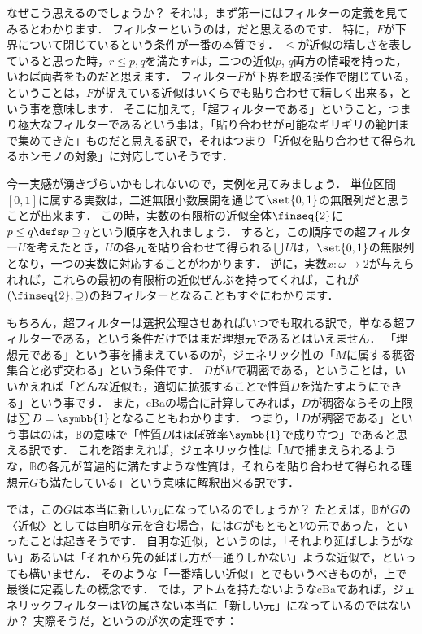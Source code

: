 \documentclass[a4j]{ltjsarticle}
\newcommand{\mathds}[1]{\symbb{#1}}
\renewcommand{\emph}[1]{\textbf{\textgt{#1}}}
\begin{document}
なぜこう思えるのでしょうか？
それは，まず第一にはフィルターの定義を見てみるとわかります．
フィルターというのは，\emph{貼り合わせられる近似の集合}だと思えるのです．
特に，$F$が下界について閉じているという条件が一番の本質です．
$\leq$が近似の精しさを表していると思った時，$r \leq p, q$を満たす$r$は，二つの近似$p$, $q$両方の情報を持った，いわば両者を\emph{貼り合わせた}ものだと思えます．
フィルター$F$が下界を取る操作で閉じている，ということは，$F$が捉えている近似はいくらでも貼り合わせて精しく出来る，という事を意味します．
そこに加えて，「超フィルターである」ということ，つまり極大なフィルターであるという事は，「貼り合わせが可能なギリギリの範囲まで集めてきた」ものだと思える訳で，それはつまり「近似を貼り合わせて得られるホンモノの対象」に対応していそうです．

今一実感が湧きづらいかもしれないので，実例を見てみましょう．
単位区間$[0,1]$に属する実数は，二進無限小数展開を通じて$\set{0, 1}$の無限列だと思うことが出来ます．
この時，実数の有限桁の近似全体$\finseq{2}$に$p \leq q \defs p \supseteq q$という順序を入れましょう．
すると，この順序での超フィルター$U$を考えたとき，$U$の各元を貼り合わせて得られる$\bigcup U$は，$\set{0, 1}$の無限列となり，一つの実数に対応することがわかります．
逆に，実数$x : \omega \to 2$が与えられれば，これらの最初の有限桁の近似ぜんぶを持ってくれば，これが$(\finseq{2}, \supseteq)$の超フィルターとなることもすぐにわかります．

もちろん，超フィルターは選択公理させあればいつでも取れる訳で，単なる超フィルターである，という条件だけではまだ理想元であるとはいえません．
「理想元である」という事を捕まえているのが，ジェネリック性の「$M$に属する稠密集合と必ず交わる」という条件です．
$D$が$M$で稠密である，ということは，いいかえれば「どんな近似も，適切に拡張することで性質$D$を満たすようにできる」という事です．
また，cBaの場合に計算してみれば，$D$が稠密ならその上限は$\sum D = \mathds{1}$となることもわかります．
つまり，「$D$が稠密である」という事はのは，$\mathbb{B}$の意味で「性質$D$はほぼ確率$\mathds{1}$で成り立つ」であると思える訳です．
これを踏まえれば，ジェネリック性は「$M$で捕まえられるような，$\mathbb{B}$の各元が普遍的に満たすような性質は，それらを貼り合わせて得られる理想元$G$も満たしている」という意味に解釈出来る訳です．

では，この$G$は本当に新しい元になっているのでしょうか？
たとえば，$\mathbb{B}$が$G$の〈近似〉としては自明な元を含む場合，には$G$がもともと$V$の元であった，といったことは起きそうです．
自明な近似，というのは，「それより延ばしようがない」あるいは「それから先の延ばし方が一通りしかない」ような近似で，といっても構いません．
そのような「一番精しい近似」とでもいうべきものが，上で最後に定義した\emph{アトム}の概念です．
では，アトムを持たないようなcBaであれば，ジェネリックフィルターは$V$の属さない本当に「新しい元」になっているのではないか？
実際そうだ，というのが次の定理です：
\end{document}
